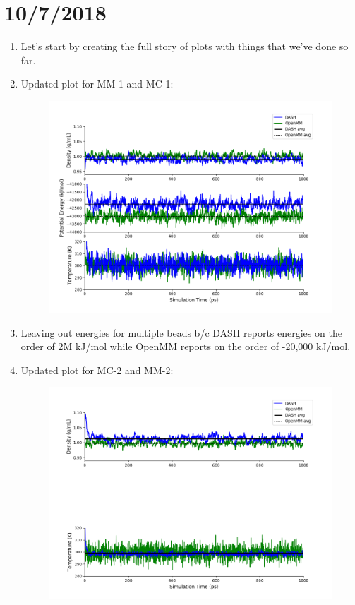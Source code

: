 \documentclass[12pt,reqno]{amsart}
\numberwithin{equation}{section}
\begin{document}
\section{10/7/2018}
\begin{enumerate}
\item Let's start by creating the full story of plots with things that we've done so far. 
\item Updated plot for MM-1 and MC-1:
\begin{figure}[H]
\centering
\includegraphics[scale=0.7]{MC-MM-nBead1-rCut9-ts05-update}
\end{figure}
\item Leaving out energies for multiple beads b/c DASH reports energies on the order of 2M kJ/mol while OpenMM reports on the order of -20,000 kJ/mol.  
\item Updated plot for MC-2 and MM-2: 
\begin{figure}[H]
\centering
\includegraphics[scale=0.7]{MC-MM-nBead16-rCut9-ts05-update}

\end{figure}
\end{enumerate}
\end{document}
